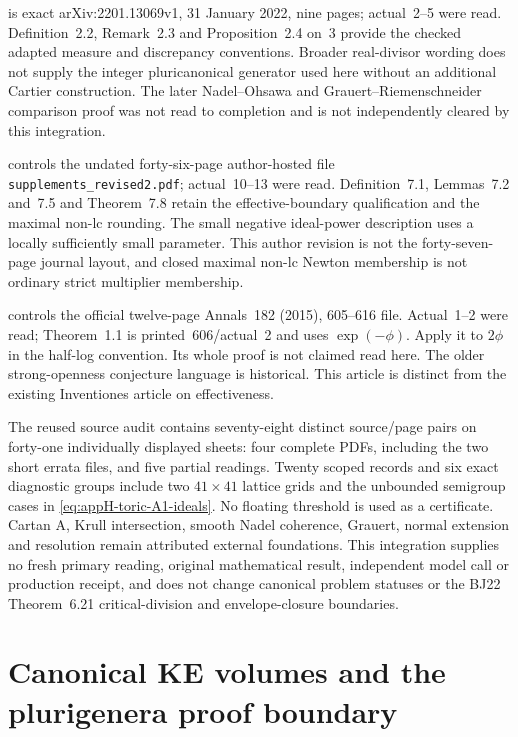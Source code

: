 \cite{Li22KollarArchivedV1} is exact arXiv:2201.13069v1,
31 January 2022, nine pages; actual~2--5 were read. Definition~2.2,
Remark~2.3 and Proposition~2.4 on~3 provide the checked adapted
measure and discrepancy conventions. Broader real-divisor wording
does not supply the integer pluricanonical generator used here without
an additional Cartier construction. The later Nadel--Ohsawa and
Grauert--Riemenschneider comparison proof was not read to completion
and is not independently cleared by this integration.

\cite{FujinoSchwedeTakagiAuthorRevision} controls the undated
forty-six-page author-hosted file
\nolinkurl{supplements_revised2.pdf}; actual~10--13 were read.
Definition~7.1, Lemmas~7.2 and~7.5 and Theorem~7.8 retain the
effective-boundary qualification and the maximal non-lc rounding.
The small negative ideal-power description uses a locally sufficiently
small parameter. This author revision is not the forty-seven-page
journal layout, and closed maximal non-lc Newton membership is not
ordinary strict multiplier membership.

\cite{GuanZhou15AnnalsPublished} controls the official twelve-page
Annals~182 (2015), 605--616 file. Actual~1--2 were read;
Theorem~1.1 is printed~606/actual~2 and uses $\exp(-\phi)$.
Apply it to $2\phi$ in the half-log convention. Its whole proof
is not claimed read here. The older strong-openness conjecture
language is historical. This article is distinct from the existing
\cite{GZ15} Inventiones article on effectiveness.

The reused source audit contains seventy-eight distinct source/page
pairs on forty-one individually displayed sheets: four complete PDFs,
including the two short errata files, and five partial readings.
Twenty scoped records and six exact diagnostic groups include two
$41\times41$ lattice grids and the unbounded semigroup cases in
\eqref{eq:appH-toric-A1-ideals}. No floating threshold is used as
a certificate. Cartan A, Krull intersection, smooth Nadel coherence,
Grauert, normal extension and resolution remain attributed external
foundations. This integration supplies no fresh primary reading,
original mathematical result, independent model call or production
receipt, and does not change canonical problem statuses or the BJ22
Theorem~6.21 critical-division and envelope-closure boundaries.

\section{Canonical KE volumes and the plurigenera proof boundary}
\label{sec:provenance-KE-family-normalization}

